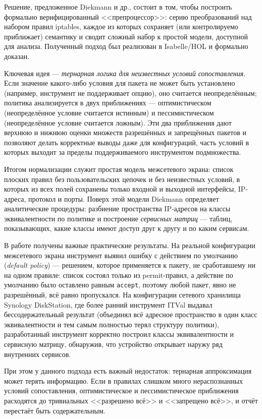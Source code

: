 Решение, предложенное Diekmann и др., состоит в том, чтобы построить формально верифицированный <<препроцессор>>: серию преобразований над набором правил iptables, каждое из которых сохраняет (или контролируемо приближает) семантику и сводит сложный набор к простой модели, доступной для анализа. Полученный подход был реализован в Isabelle/HOL и формально доказан.

Ключевая идея --- \emph{тернарная логика для неизвестных условий сопоставления}. Если значение какого-либо условия для пакета не может быть установлено (например, инструмент не поддерживает опцию), оно считается неопределённым; политика анализируется в двух приближениях --- оптимистическом (неопределённое условие считается истинным) и пессимистическом (неопределённое условие считается ложным). Эти два приближения дают верхнюю и нижнюю оценки множеств разрешённых и запрещённых пакетов и позволяют делать корректные выводы даже для конфигураций, часть условий в которых выходит за пределы поддерживаемого инструментом подмножества.

Итогом нормализации служит простая модель межсетевого экрана: список плоских правил без пользовательских цепочек и без неизвестных условий, в которых из всех полей сохранены только входной и выходной интерфейсы, IP-адреса, протокол и порты. Поверх этой модели Diekmann определяет аналитические процедуры: разбиение пространства IP-адресов на классы эквивалентности по политике и построение \emph{сервисных матриц} --- таблиц, показывающих, какие классы имеют доступ друг к другу и по каким сервисам.

В работе получены важные практические результаты. На реальной конфигурации межсетевого экрана инструмент выявил ошибку с действием по умолчанию (\emph{default policy}) --- решением, которое применяется к пакету, не сработавшему ни на одном правиле: список состоял только из permit-правил, а действие по умолчанию было оставлено равным \texttt{accept}, поэтому любой пакет, явно не разрешённый, всё равно пропускался. На конфигурации сетевого хранилища Synology DiskStation, где более ранний инструмент ITVal выдавал бессодержательный результат (объединял всё адресное пространство в один класс эквивалентности и тем самым полностью терял структуру политики), разработанный инструмент корректно построил классы эквивалентности и сервисную матрицу, обнаружив, что устройство открывает наружу ряд внутренних сервисов.

При этом у данного подхода есть важный недостаток: тернарная аппроксимация может терять информацию. Если в правилах слишком много нераспознанных условий сопоставления, оптимистическое и пессимистическое приближения расходятся до тривиальных <<разрешено всё>> и <<запрещено всё>>, и отчёт перестаёт быть содержательным.

